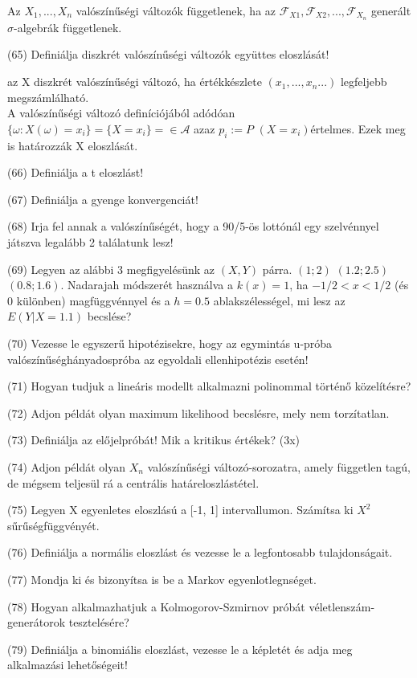 \documentclass[12p]{article}
\begin{document}
 Az $X_1,...,X_n$ valószínűségi változók függetlenek, ha az $\mathscr{F}_{X1}, \mathscr{F}_{X2} ,...,\mathscr{F}_{X_n}$ generált $\sigma$-algebrák függetlenek.

(65) Definiálja diszkrét valószínűségi változók együttes eloszlását!

az X diszkrét valószínűségi változó, ha értékkészlete $(x_1 ,..., x_n...)$ legfeljebb megszámlálható.\\
A valószínűségi változó definíciójából adódóan $\{\omega:X(\omega)= x_i\}=\{X=x_i\}= \in \mathscr{A}$ azaz $p_i:=P$ $(X=x_i)$értelmes. Ezek meg is határozzák X eloszlását.

(66) Definiálja a t eloszlást!

(67) Definiálja a gyenge konvergenciát!

(68) Irja fel annak a valószínűségét, hogy a 90/5-ös lottónál egy szelvénnyel játszva legalább 2 találatunk lesz!

(69) Legyen az alábbi 3 megfigyelésünk az $(X, Y)$ párra. $(1;2)$ $(1.2;2.5)$ $(0.8;1.6)$. Nadarajah
módszerét használva a $k(x) = 1$, ha $-1/2 < x < 1/2$ (és 0 különben) magfüggvénnyel és a $h = 0.5$ ablakszélességel, mi lesz az $E(Y|X = 1.1)$ becslése?

(70) Vezesse le egyszerű hipotézisekre, hogy az egymintás u-próba valószínűséghányadospróba az egyoldali ellenhipotézis esetén!

(71) Hogyan tudjuk a lineáris modellt alkalmazni polinommal történő közelítésre?

(72) Adjon példát olyan maximum likelihood becslésre, mely nem torzítatlan.

(73) Definiálja az előjelpróbát! Mik a kritikus értékek? (3x)

(74) Adjon példát olyan $X_n$ valószínűségi változó-sorozatra, amely független tagú, de mégsem teljesül rá a centrális határeloszlástétel.

(75) Legyen X egyenletes eloszlású a [-1, 1] intervallumon. Számítsa ki $X^2$ sűrűségfüggvényét.

(76) Definiálja a normális eloszlást és vezesse le a legfontosabb tulajdonságait.

(77) Mondja ki és bizonyítsa is be a Markov egyenlotlegnséget.

(78) Hogyan alkalmazhatjuk a Kolmogorov-Szmirnov próbát véletlenszám-generátorok tesztelésére?

(79) Definiálja a binomiális eloszlást, vezesse le a képletét és adja meg alkalmazási lehetőségeit!
\end{document}
